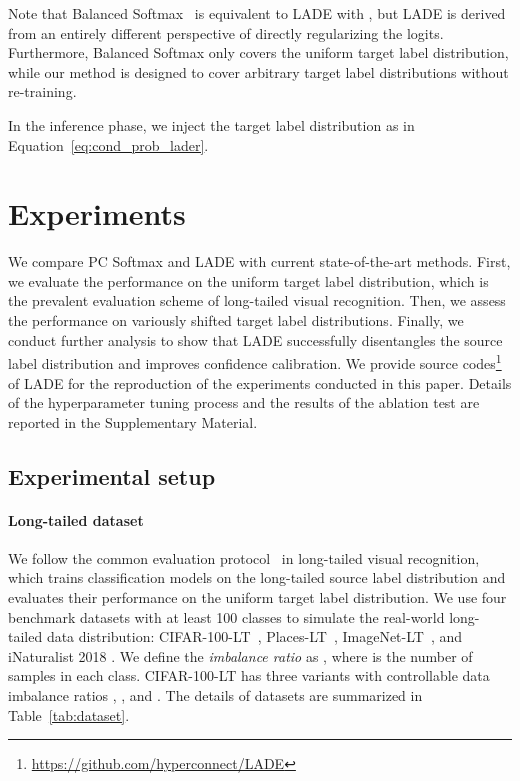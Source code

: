 \documentclass[final]{cvpr}
\begin{document}
Note that Balanced Softmax~\cite{ren2020balanced} is equivalent to LADE with , but LADE is derived from an entirely different perspective of directly regularizing the logits.
Furthermore, Balanced Softmax only covers the uniform target label distribution, while our method is designed to cover arbitrary target label distributions without re-training.

In the inference phase, we inject the target label distribution as in Equation~\ref{eq:cond_prob_lader}. \section{Experiments}\label{sec:4_experiments}
We compare PC Softmax and LADE with current state-of-the-art methods.
First, we evaluate the performance on the uniform target label distribution, which is the prevalent evaluation scheme of long-tailed visual recognition. 
Then, we assess the performance on variously shifted target label distributions.
Finally, we conduct further analysis to show that LADE successfully disentangles the source label distribution and improves confidence calibration.
We provide source codes\footnote{\url{https://github.com/hyperconnect/LADE}} of LADE for the reproduction of the experiments conducted in this paper.
Details of the hyperparameter tuning process and the results of the ablation test are reported in the Supplementary Material.


\subsection{Experimental setup}\label{sec:4_1_experimental_setup}
\paragraph{Long-tailed dataset}
We follow the common evaluation protocol~\cite{liu2019large, cao2019learning,zhou2020bbn,tang2020long} in long-tailed visual recognition, which trains classification models on the long-tailed source label distribution and evaluates their performance on the uniform target label distribution.
We use four benchmark datasets with at least 100 classes to simulate the real-world long-tailed data distribution: CIFAR-100-LT~\cite{cao2019learning}, Places-LT~\cite{liu2019large}, ImageNet-LT~\cite{liu2019large}, and iNaturalist 2018 \cite{van2018inaturalist}.
We define the \textit{imbalance ratio} as , where  is the number of samples in each class.
CIFAR-100-LT has three variants with controllable data imbalance ratios , , and .
The details of datasets are summarized in Table~\ref{tab:dataset}.
\end{document}
